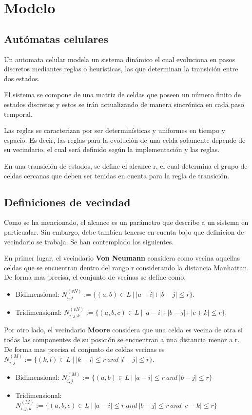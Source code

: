 \section{Modelo}\label{sec:modelo}

\subsection{Autómatas celulares}\label{subsec:automatas-celulares}

Un automata celular modela un sistema dinámico el cual evoluciona en pasos discretos mediantes reglas o heurísticas,
las que determinan la transición entre dos estados.

El sistema se compone de una matriz de celdas que poseen un número finito de estados discretos y estos se irán actualizando
de manera sincrónica en cada paso temporal.

Las reglas se caracterizan por ser determinísticas y uniformes en tiempo y espacio. Es decir, las reglas para la evolución 
de una celda solamente depende de su vecindario, el cual será definido según la implementación y las reglas.

En una transición de estados, se define el alcance r, el cual determina el grupo de celdas cercanas que deben ser 
tenidas en cuenta para la regla de transición.

\subsection{Definiciones de vecindad}\label{subsec:definiciones-de-vecindad}
Como se ha mencionado, el alcance es un parámetro que describe a un sistema en particualar. Sin embargo, debe tambien
tenerse en cuenta bajo que definicion de vecindario se trabaja. Se han contemplado los siguientes.

En primer lugar, el vecindario \textbf{Von Neumann} considera como vecina aquellas celdas que se encuentran dentro del rango r
considerando la distancia Manhattan. De forma mas precisa, el conjunto de vecinas se define como:
\begin{itemize}
    \item Bidimensional: $N_{i,j}^{(vN)}:=\{(a,b) \in L\ |\ |a - i| + |b - j| \leq r\}$.
    \item Tridimensional: $N_{i,j, k}^{(vN)}:=\{(a,b,c) \in L\ |\ |a-i| + |b - j| + |c + k| \leq r\}$.
\end{itemize}


Por otro lado, el vecindario \textbf{Moore} considera que una celda es vecina de otra si todas las componentes de su posición se encuentran
a una distancia menor a r. De forma mas precisa el conjunto de celdas vecinas es $N_{i,j}^{(M)}:=\{(k,l) \in L\ |\ |k-i|\leq r\ and\ |l - j| \leq r \}$.
\begin{itemize}
    \item Bidimensional: $N_{i,j}^{(M)}:=\{(a,b) \in L\ |\ |a-i|\leq r\ and\ |b - j| \leq r \}$
    \item Tridimensional: $N_{i,j,k}^{(M)}:=\{(a, b, c) \in L\ |\ |a-i|\leq r\ and\ |b - j|  \leq r\ and\ |c - k|  \leq r\}$
\end{itemize}


